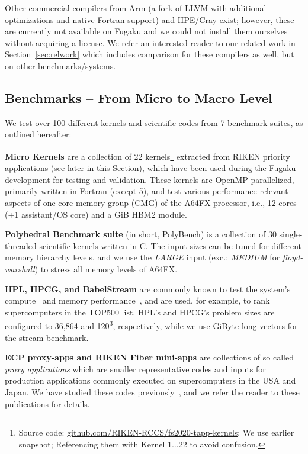 \documentclass[conference,compsoc]{IEEEtran}
\begin{document}
Other commercial compilers from Arm (a fork of LLVM with additional optimizations and native Fortran-support)
and HPE/Cray exist; however, these are currently not available on Fugaku and we could not install
them ourselves without acquiring a license. We refer an interested reader to our related work in Section~\ref{sec:relwork}
which includes comparison for these compilers as well, but on other benchmarks/systems.


\subsection{Benchmarks -- From Micro to Macro Level}\label{sec:metho:benchmarks}
We test over 100 different kernels and scientific codes from 7 benchmark suites, as outlined hereafter:

\textbf{Micro Kernels} are a collection of 22 kernels\footnote{Source code: \url{github.com/RIKEN-RCCS/fs2020-tapp-kernels};
We use earlier snapshot; Referencing them with Kernel 1$\ldots$22 to avoid confusion.} extracted from RIKEN priority applications (see
later in this Section), which have been used during the Fugaku development for testing and validation.
These kernels are OpenMP-parallelized, primarily written in Fortran (except 5), and test various
performance-relevant aspects of one core memory group (CMG) of the A64FX processor, i.e., 12 cores (+1 assistant/OS core)
and a \unit[8]{GiB} HBM2 module.

\textbf{Polyhedral Benchmark suite} (in short, PolyBench) is a collection of 30 single-threaded
scientific kernels written in C. The input sizes can be tuned for different memory hierarchy levels,
and we use the \textit{LARGE} input (exc.: \textit{MEDIUM} for \textit{floyd-warshall}) to stress all
memory levels of A64FX.

\textbf{HPL, HPCG, and BabelStream} are commonly known to test the system's compute~\cite{dongarra_linpack_1988} and
memory performance~\cite{dongarra_hpcg_2015,deakin_gpu-stream_2016}, and are used, for example, to rank supercomputers in the TOP500 list.
HPL's and HPCG's problem sizes are configured to 36,864 and 120\textsuperscript{3}, respectively, while we
use \unit[2]{GiByte} long vectors for the stream benchmark.

\textbf{ECP proxy-apps and RIKEN Fiber mini-apps} are collections of so called \textit{proxy applications}
which are smaller representative codes and inputs for production applications commonly executed on
supercomputers in the USA and Japan. We have studied these codes previously~\cite{domke_double-precision_2019,domke_matrix_2021},
and we refer the reader to these publications for details.
\end{document}
